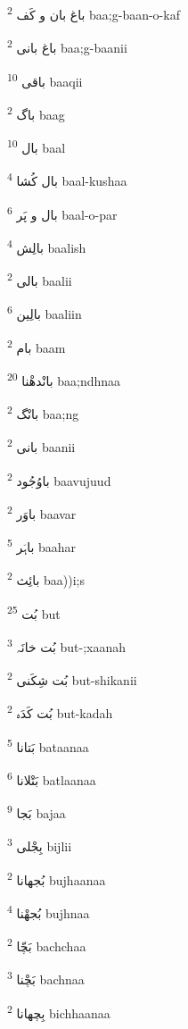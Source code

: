\documentclass[12pt]{article}
\begin{document}
\begin{RTL}
\begin{multicols}{5}
{\ur باغ بان و کَف}   \textsuperscript{2} baa;g-baan-o-kaf

{\ur باغ بانی}   \textsuperscript{2} baa;g-baanii

{\ur باقی}   \textsuperscript{10} baaqii

{\ur باگ}   \textsuperscript{2} baag

{\ur بال}   \textsuperscript{10} baal

{\ur بال کُشا}   \textsuperscript{4} baal-kushaa

{\ur بال و پَر}   \textsuperscript{6} baal-o-par

{\ur بالِش}   \textsuperscript{4} baalish

{\ur بالی}   \textsuperscript{2} baalii

{\ur بالِین}   \textsuperscript{6} baaliin

{\ur بام}   \textsuperscript{2} baam

{\ur بانْدھْنا}   \textsuperscript{20} baa;ndhnaa

{\ur بانْگ}   \textsuperscript{2} baa;ng

{\ur بانی}   \textsuperscript{2} baanii

{\ur باوُجُود}   \textsuperscript{2} baavujuud

{\ur باوَر}   \textsuperscript{2} baavar

{\ur باہَر}   \textsuperscript{5} baahar

{\ur بائِث}   \textsuperscript{2} baa))i;s

{\ur بُت}   \textsuperscript{25} but

{\ur بُت خانَہ}   \textsuperscript{3} but-;xaanah

{\ur بُت شِکَنی}   \textsuperscript{2} but-shikanii

{\ur بُت کَدَہ}   \textsuperscript{2} but-kadah

{\ur بَتانا}   \textsuperscript{5} bataanaa

{\ur بَتْلانا}   \textsuperscript{6} batlaanaa

{\ur بَجا}   \textsuperscript{9} bajaa

{\ur بِجْلی}   \textsuperscript{3} bijlii

{\ur بُجھانا}   \textsuperscript{2} bujhaanaa

{\ur بُجھْنا}   \textsuperscript{4} bujhnaa

{\ur بَچّا}   \textsuperscript{2} bachchaa

{\ur بَچْنا}   \textsuperscript{3} bachnaa

{\ur بِچھانا}   \textsuperscript{2} bichhaanaa


\end{multicols}
\end{RTL}
\end{document}
